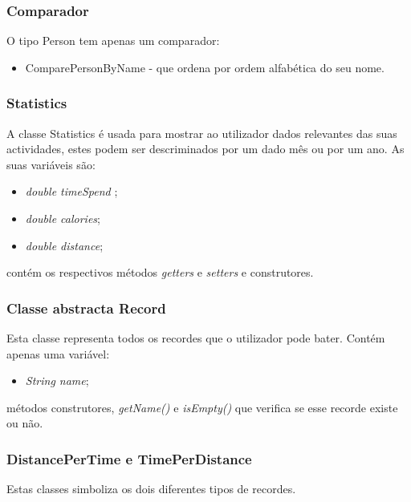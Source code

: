 \documentclass[10pt,notitlepage]{article}
\begin{document}
\subsubsection{Comparador}
O tipo Person tem apenas um comparador:
\begin{itemize}
\item ComparePersonByName - que ordena por ordem alfabética do seu nome.
\end{itemize}


\subsubsection{Statistics}

A classe Statistics é usada para mostrar ao utilizador dados relevantes das suas actividades, estes podem ser descriminados por um dado mês ou por um ano. As suas variáveis são:
\begin{itemize}
\item \textit{double timeSpend} ;
\item \textit{double calories};
\item \textit{double distance};
\end{itemize}
contém os respectivos métodos \textit{getters} e \textit{setters} e construtores.



\subsubsection{Classe abstracta Record}

Esta classe representa todos os recordes que o utilizador pode bater. Contém apenas uma variável:
\begin{itemize}
\item \textit{String name};
\end{itemize}
métodos construtores, \textit{getName()} e \textit{isEmpty()} que verifica se esse recorde existe ou não.


\subsubsection{DistancePerTime e TimePerDistance}
Estas classes simboliza os dois diferentes tipos de recordes.\\
\end{document}
